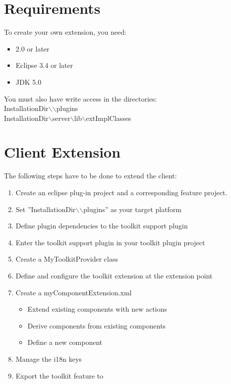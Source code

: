 \section{Requirements}
To create your own \app{} extension, you need:
\begin{itemize}
\item \app{} 2.0 or later
\item Eclipse 3.4 or later
\item JDK 5.0
\end{itemize}

You must also have write access in the directories:\\
InstallationDir$\backslash$\app{}$\backslash$plugins\\
InstallationDir$\backslash$server$\backslash$lib$\backslash$extImplClasses 

\section{\app{} Client Extension}

The following steps have to be done to extend the \app{} client:
\begin{enumerate}
 \item Create an eclipse plug-in project and a corresponding feature project.
 \item Set ''InstallationDir$\backslash$\app{}$\backslash$plugins'' as your target platform
 \item Define plugin dependencies to the toolkit support plugin
 \item Enter the toolkit support plugin in your toolkit plugin project
 \item Create a MyToolkitProvider class
 \item Define and configure the toolkit extension at the extension point
 \item Create a myComponentExtension.xml
 \begin{itemize}
  \item Extend existing \app{} components with new actions
  \item Derive components from existing \app{} components
  \item Define a new component
 \end{itemize}
 \item Manage the i18n keys
 \item Export the toolkit feature to \app{}
\end{enumerate}

